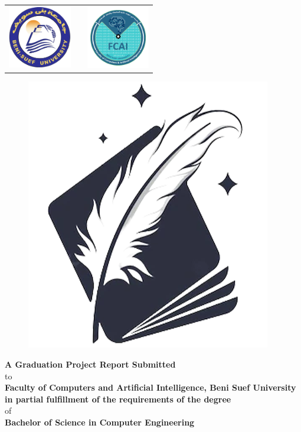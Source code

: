 \pagecolor{gpCoverBGColor}\afterpage{\nopagecolor}
\thispagestyle{empty}
{\color{gpCoverTextColor}

\begin{table}[h]
    \centering
    \begin{tabular}{c p{} c}
    \includegraphics[width=1.09in]{images/BSU-logo.png}
    &
    &
    \includegraphics[width=1.09in]{images/FCAI-logo.png}
    \end{tabular}
\end{table}

\begin{center}
    \vspace{10pt}
    {\fontsize{32}{50} \selectfont \textbf{\gpProject{}}}
    \vspace{15pt}
    
    \begin{figure}[H]
    \centering
    \includegraphics[width=0.3\linewidth]{images/logo.png}
    \label{fig:logo}
    \end{figure}

    \vspace{10pt}
    \textbf{A Graduation Project Report Submitted}
    \vspace{3pt}\\
    to
    \vspace{3pt}\\
    \textbf{Faculty of Computers and Artificial Intelligence, Beni Suef University} 
    \vspace{3pt}\\
    \textbf{in partial fulfillment of the requirements of the degree}
    \vspace{3pt}\\
    of
    \vspace{3pt}\\
    \textbf{Bachelor of Science in Computer Engineering}
    \vspace{10pt}
    

\end{center}}
